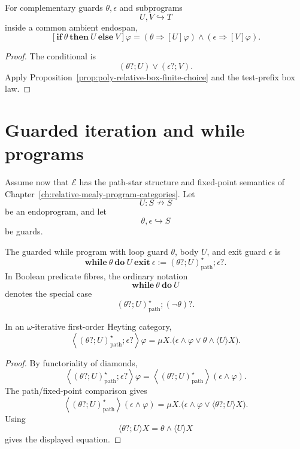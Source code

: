 \begin{proposition}
\label{prop:poly-relative-conditional-box-law}
For complementary guards \(\theta,\epsilon\) and subprograms
\[
U,V\hookrightarrow T
\]
inside a common ambient endospan,
\[
\left[
\mathbf{if}\ \theta\ \mathbf{then}\ U\ \mathbf{else}\ V
\right]\varphi
=
(\theta\Rightarrow[U]\varphi)
\wedge
(\epsilon\Rightarrow[V]\varphi).
\]
\end{proposition}

\begin{proof}
The conditional is
\[
(\theta?;U)\vee(\epsilon?;V).
\]
Apply Proposition~\ref{prop:poly-relative-box-finite-choice} and the test-prefix
box law.
\end{proof}

\section{Guarded iteration and while programs}
\label{sec:poly-relative-while-programs}

Assume now that \(\mathcal E\) has the path-star structure and fixed-point
semantics of Chapter~\ref{ch:relative-mealy-program-categories}.  Let
\[
U:S\nrightarrow S
\]
be an endoprogram, and let
\[
\theta,\epsilon\hookrightarrow S
\]
be guards.

\begin{definition}
\label{def:poly-relative-guarded-while-program}
The guarded while program with loop guard \(\theta\), body \(U\), and exit
guard \(\epsilon\) is
\[
\mathbf{while}\ \theta\ \mathbf{do}\ U\ \mathbf{exit}\ \epsilon
:=
(\theta?;U)^\star_{\mathrm{path}};\epsilon?.
\]
In Boolean predicate fibres, the ordinary notation
\[
\mathbf{while}\ \theta\ \mathbf{do}\ U
\]
denotes the special case
\[
(\theta?;U)^\star_{\mathrm{path}};(\neg\theta)?.
\]
\end{definition}

\begin{theorem}
\label{thm:poly-relative-while-diamond}
In an \(\omega\)-iterative first-order Heyting category,
\[
\left\langle
(\theta?;U)^\star_{\mathrm{path}};\epsilon?
\right\rangle\varphi
=
\mu X.\bigl(
\epsilon\wedge\varphi
\vee
\theta\wedge\langle U\rangle X
\bigr).
\]
\end{theorem}

\begin{proof}
By functoriality of diamonds,
\[
\left\langle
(\theta?;U)^\star_{\mathrm{path}};\epsilon?
\right\rangle\varphi
=
\left\langle
(\theta?;U)^\star_{\mathrm{path}}
\right\rangle
(\epsilon\wedge\varphi).
\]
The path/fixed-point comparison gives
\[
\left\langle
(\theta?;U)^\star_{\mathrm{path}}
\right\rangle
(\epsilon\wedge\varphi)
=
\mu X.\bigl(
\epsilon\wedge\varphi
\vee
\langle\theta?;U\rangle X
\bigr).
\]
Using
\[
\langle\theta?;U\rangle X
=
\theta\wedge\langle U\rangle X
\]
gives the displayed equation.
\end{proof}

